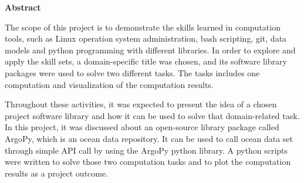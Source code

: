 \textbf{Abstract} \newline

The scope of this project is to demonstrate the skills learned in computation tools, such as Linux operation system administration, bash scripting, git, data models and python programming with different libraries. In order to explore and apply the skill sets, a domain-specific title was chosen, and its software library packages were used to solve two different tasks. The tasks includes one computation and visualization of the computation results. \newline

\noindent Throughout these activities, it was expected to present the idea of a chosen project software library and how it can be used to solve that domain-related task. In this project, it was discussed about an open-source library package called ArgoPy, which is an ocean data repository. It can be used to call ocean data set through simple API call by using the ArgoPy python library. A python scripts were written to solve those two computation tasks and to plot the computation results as a project outcome.

\newpage
